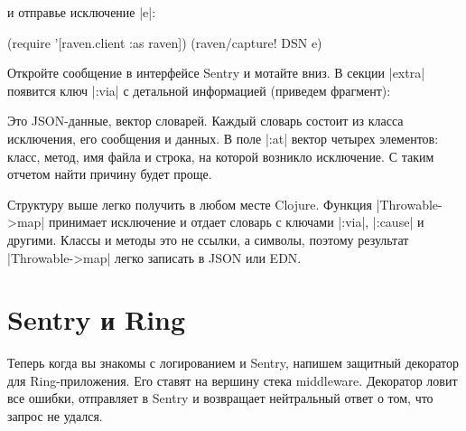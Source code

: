 \begin{english}
  \begin{clojure}
  \end{clojure}
\end{english}

\noindent
и отправье исключение \spverb|e|:

\begin{english}
  \begin{clojure}
(require '[raven.client :as raven])
(raven/capture! DSN e)
  \end{clojure}
\end{english}

Откройте сообщение в интерфейсе Sentry и мотайте вниз. В секции \spverb|extra|
появится ключ \spverb|:via| с детальной информацией (приведем фрагмент):

\begin{english}
  \begin{json}
  \end{json}
\end{english}

Это JSON-данные, вектор словарей. Каждый словарь состоит из класса исключения,
его сообщения и данных. В поле \spverb|:at| вектор четырех элементов: класс,
метод, имя файла и строка, на которой возникло исключение. С таким отчетом найти
причину будет проще.

Структуру выше легко получить в любом месте Clojure. Функция
\spverb|Throwable->map| принимает исключение и отдает словарь с ключами
\spverb|:via|, \spverb|:cause| и другими. Классы и методы это не ссылки, а
символы, поэтому результат \spverb|Throwable->map| легко записать в JSON или
EDN.

\section{Sentry и Ring}

Теперь когда вы знакомы с логированием и Sentry, напишем защитный декоратор для
Ring-приложения. Его ставят на вершину стека middleware. Декоратор ловит все
ошибки, отправляет в Sentry и возвращает нейтральный ответ о том, что запрос не
удался.

